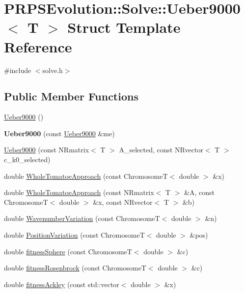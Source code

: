 \hypertarget{struct_p_r_p_s_evolution_1_1_solve_1_1_ueber9000}{\section{P\-R\-P\-S\-Evolution\-:\-:Solve\-:\-:Ueber9000$<$ T $>$ Struct Template Reference}
\label{struct_p_r_p_s_evolution_1_1_solve_1_1_ueber9000}
}


{\ttfamily \#include $<$solve.\-h$>$}

\subsection*{Public Member Functions}
\begin{DoxyCompactItemize}
\item 
\hyperlink{struct_p_r_p_s_evolution_1_1_solve_1_1_ueber9000_ae2c12a52888f6059b224328409b3e2a9}{Ueber9000} ()
\item 
\hypertarget{struct_p_r_p_s_evolution_1_1_solve_1_1_ueber9000_a6e90ccb5ae732cacc451ed1453ce24a5}{{\bfseries Ueber9000} (const \hyperlink{struct_p_r_p_s_evolution_1_1_solve_1_1_ueber9000}{Ueber9000} \&me)}\label{struct_p_r_p_s_evolution_1_1_solve_1_1_ueber9000_a6e90ccb5ae732cacc451ed1453ce24a5}

\item 
\hyperlink{struct_p_r_p_s_evolution_1_1_solve_1_1_ueber9000_a778934cabe087406070bb097b0c87ccf}{Ueber9000} (const N\-Rmatrix$<$ T $>$ A\-\_\-selected, const N\-Rvector$<$ T $>$ c\-\_\-k0\-\_\-selected)
\item 
double \hyperlink{struct_p_r_p_s_evolution_1_1_solve_1_1_ueber9000_a63828a4aab2a1136fe60a04a415463d2}{Whole\-Tomatoe\-Approach} (const Chromosome\-T$<$ double $>$ \&x)
\item 
double \hyperlink{struct_p_r_p_s_evolution_1_1_solve_1_1_ueber9000_a491554bfcf03c6ebdee7ce0f35a7885b}{Whole\-Tomatoe\-Approach} (const N\-Rmatrix$<$ T $>$ \&A, const Chromosome\-T$<$ double $>$ \&x, const N\-Rvector$<$ T $>$ \&b)
\item 
double \hyperlink{struct_p_r_p_s_evolution_1_1_solve_1_1_ueber9000_a8c5b7010f194ef1405678421ba3b3982}{Wavenumber\-Variation} (const Chromosome\-T$<$ double $>$ \&n)
\item 
double \hyperlink{struct_p_r_p_s_evolution_1_1_solve_1_1_ueber9000_ab39566fd4c2026d407f977c8af84e2a6}{Position\-Variation} (const Chromosome\-T$<$ double $>$ \&pos)
\item 
double \hyperlink{struct_p_r_p_s_evolution_1_1_solve_1_1_ueber9000_a279407225ce9159c55bc9e1657780b02}{fitness\-Sphere} (const Chromosome\-T$<$ double $>$ \&c)
\item 
double \hyperlink{struct_p_r_p_s_evolution_1_1_solve_1_1_ueber9000_a28a32009901241149fd423aaab3256f0}{fitness\-Rosenbrock} (const Chromosome\-T$<$ double $>$ \&c)
\item 
double \hyperlink{struct_p_r_p_s_evolution_1_1_solve_1_1_ueber9000_a52538fc6366c3f55438a2e3960aeba67}{fitness\-Ackley} (const std\-::vector$<$ double $>$ \&x)
\end{DoxyCompactItemize}

